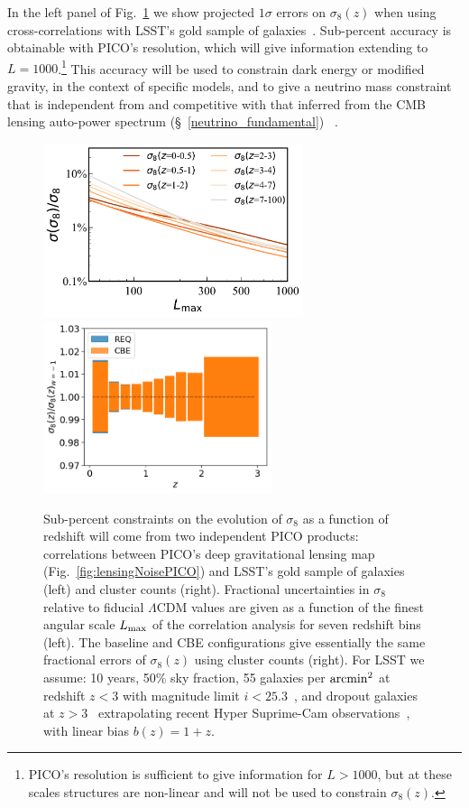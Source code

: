 \documentclass[PICOReport.tex]{subfiles}
\begin{document}
In the left panel of Fig.~\ref{fig:sigma8}  we show projected $1\sigma$ errors on $\sigma_8(z)$ when using cross-correlations with LSST's gold sample of galaxies~\citep{LSSTSciBook}.  Sub-percent accuracy is obtainable with PICO's resolution, which will give information extending to $L =1000$.\footnote{PICO's resolution is sufficient to give information for $L>1000$, but at these scales structures are non-linear and will not be used to constrain $\sigma_{8}(z)$.} This accuracy will be used to constrain dark energy or modified gravity, in the context of specific models, and to give a neutrino mass constraint that is independent from and competitive with that inferred from the CMB lensing auto-power spectrum (\S~\ref{neutrino_fundamental})~\citep{2018arXiv180902120Y} .

\begin{figure}
\centering
\hspace{-0.15in}
\includegraphics[width=3in]{images/PICO_s8_lmax_PICOv4.1b_deproj0_SENS0_LSST10yrGold.pdf}
\hspace{-0.1in}
\includegraphics[width=2.65in,trim= 0cm -0.25cm 0cm 0cm]{images/PICOs8.png}
\vspace{-0.14in}
\caption{\captiontext  
Sub-percent constraints on the evolution of $\sigma_{8}$ as a function of redshift will come from two independent PICO products: correlations between PICO's deep gravitational lensing map (Fig.~\ref{fig:lensingNoisePICO}) and LSST's gold sample of galaxies (left) and cluster counts (right). Fractional uncertainties in $\sigma_{8}$ relative to fiducial $\Lambda$CDM values are given as a function of the finest angular scale $L_{\rm max}$ of the correlation analysis for seven redshift bins (left).  The baseline and CBE configurations give essentially the same fractional errors of $\sigma_{8}(z)$ using cluster counts (right).  For LSST we assume: 10 years, 50\% sky fraction, 55 galaxies per ${\rm arcmin}^{2}$ at redshift $z<3$ with magnitude limit $i <25.3$~\citep{LSSTSciBook}, and dropout galaxies at $z>3$~\citep{dropouts} extrapolating recent Hyper Suprime-Cam observations~\cite{Schmittfull/Seljak,HSC1,HSC2}, with linear bias $b(z)=1+z$.
\label{fig:sigma8} }
\vspace{-0.16in}
\end{figure}
\end{document}
